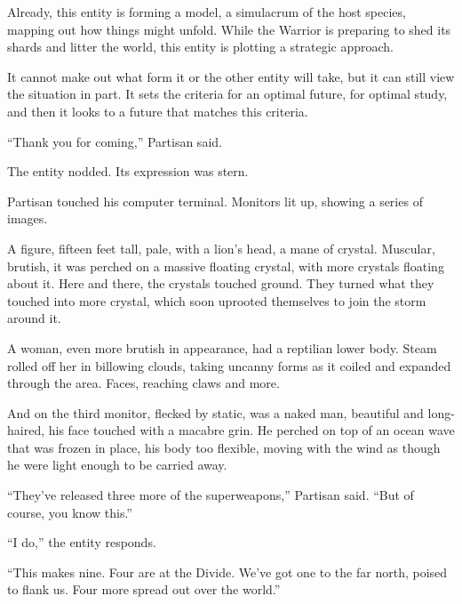 Already, this entity is forming a model, a simulacrum of the host species, mapping out how things might unfold.  While the Warrior is preparing to shed its shards and litter the world, this entity is plotting a strategic approach.



It cannot make out what form it or the other entity will take, but it can still view the situation in part.  It sets the criteria for an optimal future, for optimal study, and then it looks to a future that matches this criteria.



\sectionbreak



``Thank you for coming,'' Partisan said.



The entity nodded.  Its expression was stern.



Partisan touched his computer terminal.  Monitors lit up, showing a series of images.



A figure, fifteen feet tall, pale, with a lion's head, a mane of crystal.  Muscular, brutish, it was perched on a massive floating crystal, with more crystals floating about it. Here and there, the crystals touched ground.  They turned what they touched into more crystal, which soon uprooted themselves to join the storm around it.



A woman, even more brutish in appearance, had a reptilian lower body.  Steam rolled off her in billowing clouds, taking uncanny forms as it coiled and expanded through the area.  Faces, reaching claws and more.



And on the third monitor, flecked by static, was a naked man, beautiful and long-haired, his face touched with a macabre grin.  He perched on top of an ocean wave that was frozen in place, his body too flexible, moving with the wind as though he were light enough to be carried away.



``They've released three more of the superweapons,'' Partisan said.  ``But of course, you know this.''



``I do,'' the entity responds.



``This makes nine.  Four are at the Divide.  We've got one to the far north, poised to flank us.  Four more spread out over the world.''




